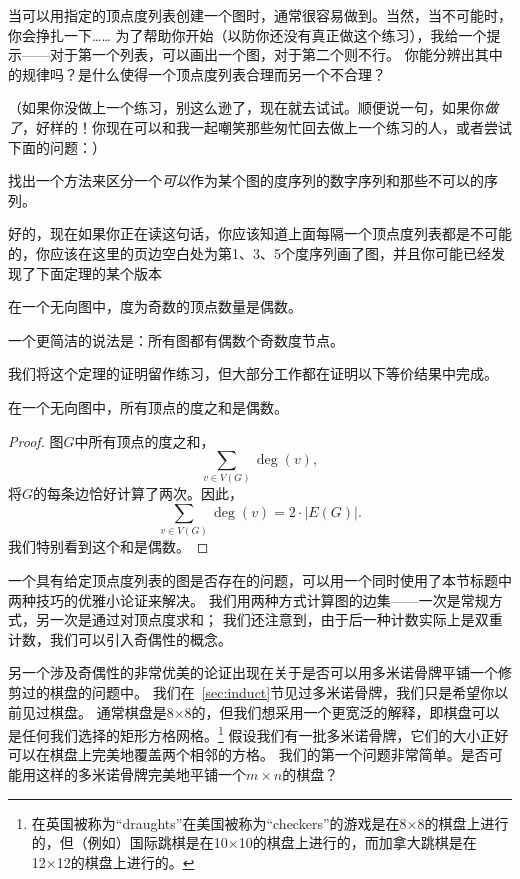 当可以用指定的顶点度列表创建一个图时，通常很容易做到。当然，当不可能时，你会挣扎一下…… 为了帮助你开始（以防你还没有真正做这个练习），我给一个提示——对于第一个列表，可以画出一个图，对于第二个则不行。
你能分辨出其中的规律吗？是什么使得一个顶点度列表合理而另一个不合理？

\begin{exer}
（如果你没做上一个练习，别这么逊了，现在就去试试。顺便说一句，如果你\emph{做了}，好样的！你现在可以和我一起嘲笑那些匆忙回去做上一个练习的人，或者尝试下面的问题：）

找出一个方法来区分一个\emph{可以}作为某个图的度序列的数字序列和那些不可以的序列。
\end{exer}

好的，现在如果你正在读这句话，你应该知道上面每隔一个顶点度列表都是不可能的，你应该在这里的页边空白处为第1、3、5个度序列画了图，并且你可能已经发现了下面定理的某个版本

\begin{thm}
在一个无向图中，度为奇数的顶点数量是偶数。
\end{thm}

一个更简洁的说法是：所有图都有偶数个奇数度节点。

我们将这个定理的证明留作练习，但大部分工作都在证明以下等价结果中完成。

\begin{thm}
在一个无向图中，所有顶点的度之和是偶数。
\end{thm}

\begin{proof}
图$G$中所有顶点的度之和，
\[ \sum_{v\in V(G)} \deg(v), \]
\noindent 将$G$的每条边恰好计算了两次。因此，
 \[ \sum_{v\in V(G)} \deg(v) = 2 \cdot |E(G)|. \]
我们特别看到这个和是偶数。
\end{proof}

一个具有给定顶点度列表的图是否存在的问题，可以用一个同时使用了本节标题中两种技巧的优雅小论证来解决。
我们用两种方式计算图的边集——一次是常规方式，另一次是通过对顶点度求和；
我们还注意到，由于后一种计数实际上是双重计数，我们可以引入奇偶性的概念。

另一个涉及奇偶性的非常优美的论证出现在关于是否可以用多米诺骨牌平铺一个修剪过的棋盘的问题中。
我们在~\ref{sec:induct}节见过多米诺骨牌，我们只是希望你以前见过棋盘。
通常棋盘是8×8的，但我们想采用一个更宽泛的解释，即棋盘可以是任何我们选择的矩形方格网格。\footnote{在英国被称为“draughts”在美国被称为“checkers”的游戏是在8×8的棋盘上进行的，但（例如）国际跳棋是在10×10的棋盘上进行的，而加拿大跳棋是在12×12的棋盘上进行的。}
假设我们有一批多米诺骨牌，它们的大小正好可以在棋盘上完美地覆盖两个相邻的方格。
我们的第一个问题非常简单。是否可能用这样的多米诺骨牌完美地平铺一个$m \times n$的棋盘？

